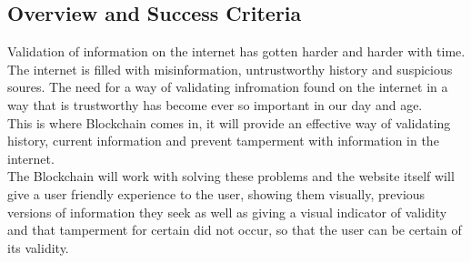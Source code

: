 \subsection{Overview and Success Criteria}

Validation of information on the internet has gotten harder and harder with time.
The internet is filled with misinformation, untrustworthy history and suspicious 
soures. The need for a way of validating infromation found on the internet in a 
way that is trustworthy has become ever so important in our day and age.\\

This is where Blockchain comes in, it will provide an effective way of validating
history, current information and prevent tamperment with information in the internet.\\

The Blockchain will work with solving these problems and the website itself will
give a user friendly experience to the user, showing them visually, previous versions
of information they seek as well as giving a visual indicator of validity and that
tamperment for certain did not occur, so that the user can be certain of its validity.
